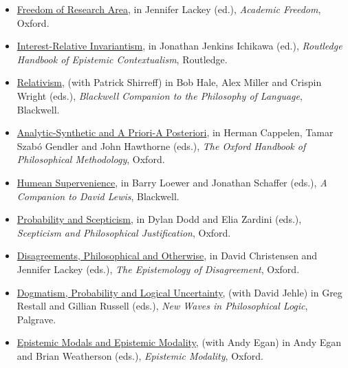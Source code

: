 \documentclass[
  10pt,
  letterpaper,
  DIV=11,
  numbers=noendperiod,
  twoside]{scrartcl}
\providecommand{\tightlist}{%
  \setlength{\itemsep}{0pt}\setlength{\parskip}{0pt}}
\begin{document}
\begin{itemize}
\tightlist
\item
  \href{https://brian.weatherson.org/quarto/posts/fora/freedom-of-research-area.html}{Freedom
  of Research Area}, in Jennifer Lackey (ed.), \emph{Academic Freedom},
  Oxford.
\item
  \href{https://brian.weatherson.org/quarto/posts/iri/interest-relative-invariantism.html}{Interest-Relative
  Invariantism}, in Jonathan Jenkins Ichikawa (ed.), \emph{Routledge
  Handbook of Epistemic Contextualism}, Routledge.
\item
  \href{https://brian.weatherson.org/quarto/posts/relativism/relativism.html}{Relativism},
  (with Patrick Shirreff) in Bob Hale, Alex Miller and Crispin Wright
  (eds.), \emph{Blackwell Companion to the Philosophy of Language},
  Blackwell.
\item
  \href{https://brian.weatherson.org/quarto/posts/synthetic/analytic-synthetic-and-a-priori-a-posteriori.html}{Analytic-Synthetic
  and A Priori-A Posteriori}, in Herman Cappelen, Tamar Szabó Gendler
  and John Hawthorne (eds.), \emph{The Oxford Handbook of Philosophical
  Methodology}, Oxford.
\item
  \href{https://brian.weatherson.org/quarto/posts/humsup/humean-supervenience.html}{Humean
  Supervenience}, in Barry Loewer and Jonathan Schaffer (eds.), \emph{A
  Companion to David Lewis}, Blackwell.
\item
  \href{https://brian.weatherson.org/quarto/posts/pas/probability-and-scepticism.html}{Probability
  and Scepticism}, in Dylan Dodd and Elia Zardini (eds.),
  \emph{Scepticism and Philosophical Justification}, Oxford.
\item
  \href{https://brian.weatherson.org/quarto/posts/dpao/disagreements-philosophical-and-otherwise.html}{Disagreements,
  Philosophical and Otherwise}, in David Christensen and Jennifer Lackey
  (eds.), \emph{The Epistemology of Disagreement}, Oxford.
\item
  \href{https://brian.weatherson.org/quarto/posts/dplu/dogmatism-probability-and-logical-uncertainty.html}{Dogmatism,
  Probability and Logical Uncertainty}, (with David Jehle) in Greg
  Restall and Gillian Russell (eds.), \emph{New Waves in Philosophical
  Logic}, Palgrave.
\item
  \href{https://brian.weatherson.org/quarto/posts/epistemic-modals/epistemic-modals-and-epistemic-modality.html}{Epistemic
  Modals and Epistemic Modality}, (with Andy Egan) in Andy Egan and
  Brian Weatherson (eds.), \emph{Epistemic Modality}, Oxford.

\end{itemize}
\end{document}
